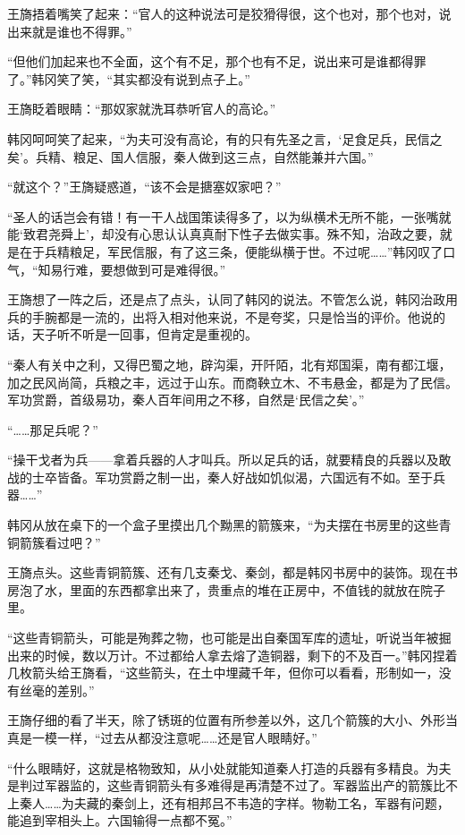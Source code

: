 王旖捂着嘴笑了起来：“官人的这种说法可是狡猾得很，这个也对，那个也对，说出来就是谁也不得罪。”

“但他们加起来也不全面，这个有不足，那个也有不足，说出来可是谁都得罪了。”韩冈笑了笑，“其实都没有说到点子上。”

王旖眨着眼睛：“那奴家就洗耳恭听官人的高论。”

韩冈呵呵笑了起来，“为夫可没有高论，有的只有先圣之言，‘足食足兵，民信之矣’。兵精、粮足、国人信服，秦人做到这三点，自然能兼并六国。”

“就这个？”王旖疑惑道，“该不会是搪塞奴家吧？”

“圣人的话岂会有错！有一干人战国策读得多了，以为纵横术无所不能，一张嘴就能‘致君尧舜上’，却没有心思认认真真耐下性子去做实事。殊不知，治政之要，就是在于兵精粮足，军民信服，有了这三条，便能纵横于世。不过呢……”韩冈叹了口气，“知易行难，要想做到可是难得很。”

王旖想了一阵之后，还是点了点头，认同了韩冈的说法。不管怎么说，韩冈治政用兵的手腕都是一流的，出将入相对他来说，不是夸奖，只是恰当的评价。他说的话，天子听不听是一回事，但肯定是重视的。

“秦人有关中之利，又得巴蜀之地，辟沟渠，开阡陌，北有郑国渠，南有都江堰，加之民风尚简，兵粮之丰，远过于山东。而商鞅立木、不韦悬金，都是为了民信。军功赏爵，首级易功，秦人百年间用之不移，自然是‘民信之矣’。”

“……那足兵呢？”

“操干戈者为兵——拿着兵器的人才叫兵。所以足兵的话，就要精良的兵器以及敢战的士卒皆备。军功赏爵之制一出，秦人好战如饥似渴，六国远有不如。至于兵器……”

韩冈从放在桌下的一个盒子里摸出几个黝黑的箭簇来，“为夫摆在书房里的这些青铜箭簇看过吧？”

王旖点头。这些青铜箭簇、还有几支秦戈、秦剑，都是韩冈书房中的装饰。现在书房泡了水，里面的东西都拿出来了，贵重点的堆在正房中，不值钱的就放在院子里。

“这些青铜箭头，可能是殉葬之物，也可能是出自秦国军库的遗址，听说当年被掘出来的时候，数以万计。不过都给人拿去熔了造铜器，剩下的不及百一。”韩冈捏着几枚箭头给王旖看，“这些箭头，在土中埋藏千年，但你可以看看，形制如一，没有丝毫的差别。”

王旖仔细的看了半天，除了锈斑的位置有所参差以外，这几个箭簇的大小、外形当真是一模一样，“过去从都没注意呢……还是官人眼睛好。”

“什么眼睛好，这就是格物致知，从小处就能知道秦人打造的兵器有多精良。为夫是判过军器监的，这些青铜箭头有多难得是再清楚不过了。军器监出产的箭簇比不上秦人……为夫藏的秦剑上，还有相邦吕不韦造的字样。物勒工名，军器有问题，能追到宰相头上。六国输得一点都不冤。”

